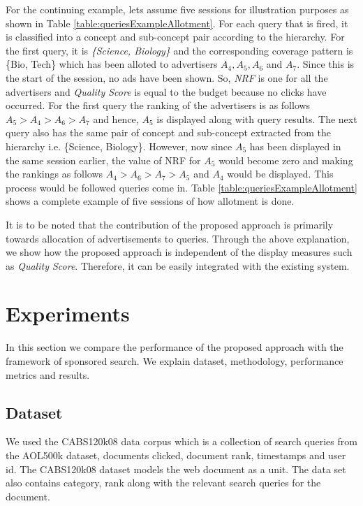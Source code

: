 For the continuing example, lets assume five sessions for illustration purposes as shown in Table \ref{table:queriesExampleAllotment}. For each query that is fired, it is classified into a concept and sub-concept pair according to the hierarchy. For the first query, it is {\it \{Science, Biology\}} and the corresponding coverage pattern is \{Bio, Tech\} which has been alloted to advertisers $A_{4}, A_{5}, A_{6}$ and $A_{7}$. Since this is the start of the session, no ads have been shown. So, {\it NRF} is one for all the advertisers and {\it Quality Score} is equal to the budget because no clicks have occurred. For the first query the ranking of the advertisers is as follows $A_{5} > A_{4} > A_{6} > A_{7}$ and hence, $A_{5}$ is displayed along with query results. The next query also has the same pair of concept and sub-concept extracted from the hierarchy i.e. \{Science, Biology\}. However, now since $A_{5}$ has been displayed in the same session earlier, the value of NRF for $A_{5}$ would become zero and making the rankings as follows $A_{4} > A_{6} > A_{7} > A_{5}$ and $A_{4}$ would be displayed. This process would be followed queries come in. Table \ref{table:queriesExampleAllotment} shows a complete example of five sessions of how allotment is done.\par
It is to be noted that the contribution of the proposed approach is primarily towards allocation of advertisements to queries. Through the above explanation, we show how the proposed approach is independent of the display measures such as {\it Quality Score}. Therefore, it can be easily integrated with the existing system.



\section{Experiments}

\label{ch4Experiments}

In this section we compare the performance of the proposed approach with the framework of sponsored search. We explain dataset, methodology, performance metrics and results. 
\subsection{Dataset}
We used the CABS120k08 \cite{CABSDATA} data corpus which is a collection of search queries from the AOL500k dataset, documents clicked, document rank, timestamps and user id. The CABS120k08 dataset models the web document as a unit. The data set also contains category, rank along with the relevant search queries for the document.  
\par

